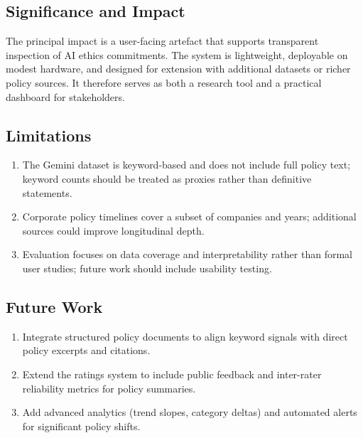 \documentclass[conference]{IEEEtran}
\begin{document}
\subsection*{Significance and Impact}
The principal impact is a user-facing artefact that supports transparent
inspection of AI ethics commitments. The system is lightweight, deployable on
modest hardware, and designed for extension with additional datasets or richer
policy sources. It therefore serves as both a research tool and a practical
dashboard for stakeholders.

\subsection*{Limitations}
\begin{enumerate}
  \item The Gemini dataset is keyword-based and does not include full policy
  text; keyword counts should be treated as proxies rather than definitive
  statements.
  \item Corporate policy timelines cover a subset of companies and years;
  additional sources could improve longitudinal depth.
  \item Evaluation focuses on data coverage and interpretability rather than
  formal user studies; future work should include usability testing.
\end{enumerate}

\subsection*{Future Work}
\begin{enumerate}
  \item Integrate structured policy documents to align keyword signals with
  direct policy excerpts and citations.
  \item Extend the ratings system to include public feedback and inter-rater
  reliability metrics for policy summaries.
  \item Add advanced analytics (trend slopes, category deltas) and automated
  alerts for significant policy shifts.
\end{enumerate}

\balance
\end{document}
